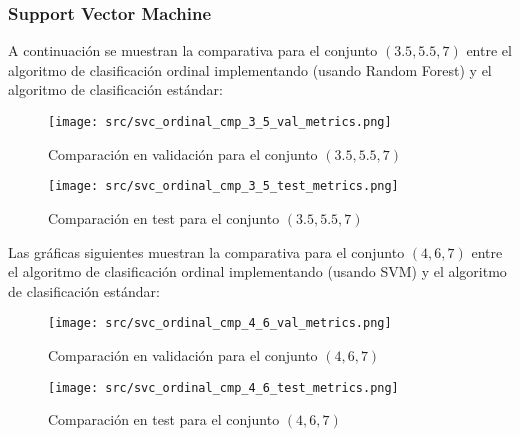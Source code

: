\subsubsection*{Support Vector Machine}
\label{sec:ord_cmp_svm}
A continuación se muestran la comparativa para el conjunto $(3.5,5.5,7)$ entre el algoritmo de clasificación ordinal implementando  (usando Random Forest)  y el algoritmo de clasificación estándar:
\begin{figure}[H]
    \centering
    \texttt{[image: src/svc\_ordinal\_cmp\_3\_5\_val\_metrics.png]}
    \caption{Comparación en validación para el conjunto  $(3.5,5.5,7)$ }
    \label{fig:svc_ordin_val_cmp_1}
\end{figure}
\begin{figure}[H]
    \centering
    \texttt{[image: src/svc\_ordinal\_cmp\_3\_5\_test\_metrics.png]}
    \caption{Comparación en test para el conjunto  $(3.5,5.5,7)$}
    \label{fig:svc_ordin_test_cmp_1}
\end{figure}
Las gráficas siguientes muestran la comparativa para el conjunto $(4,6,7)$ entre el algoritmo de clasificación ordinal implementando  (usando SVM) y el algoritmo de clasificación estándar:
\begin{figure}[H]
    \centering
    \texttt{[image: src/svc\_ordinal\_cmp\_4\_6\_val\_metrics.png]}
    \caption{Comparación en validación para el conjunto $(4,6,7)$}
    \label{fig:svc_ordin_val_cmp_2}
\end{figure}
\begin{figure}[H]
    \centering
    \texttt{[image: src/svc\_ordinal\_cmp\_4\_6\_test\_metrics.png]}
    \caption{Comparación en test para el conjunto  $(4,6,7)$}
    \label{fig:svc_ordin_test_cmp_2}
\end{figure}
